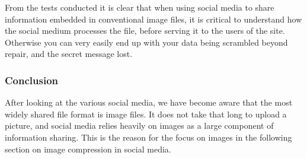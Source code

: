 From the tests conducted it is clear that when using social media to share information embedded in conventional image files, it is critical to understand how the social medium processes the file, before serving it to the users of the site.
Otherwise you can very easily end up with your data being scrambled beyond repair, and the secret message lost.

\subsubsection*{Conclusion}
After looking at the various social media, we have become aware that the most widely shared file format is image files.
It does not take that long to upload a picture, and social media relies heavily on images as a large component of information sharing.
This is the reason for the focus on images in the following section on image compression in social media.
